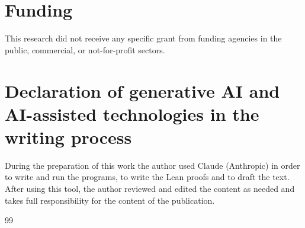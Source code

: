 \documentclass[preprint,12pt]{elsarticle}
\numberwithin{equation}{section}
\begin{document}
\section*{Funding}
This research did not receive any specific grant from funding agencies in
the public, commercial, or not-for-profit sectors.

\section*{Declaration of generative AI and AI-assisted technologies in the writing process}
During the preparation of this work the author used Claude (Anthropic) in
order to write and run the programs, to write the Lean proofs and to draft
the text. After using this tool, the author reviewed and edited the content
as needed and takes full responsibility for the content of the publication.


\begin{thebibliography}{99}
\end{thebibliography}
\end{document}
